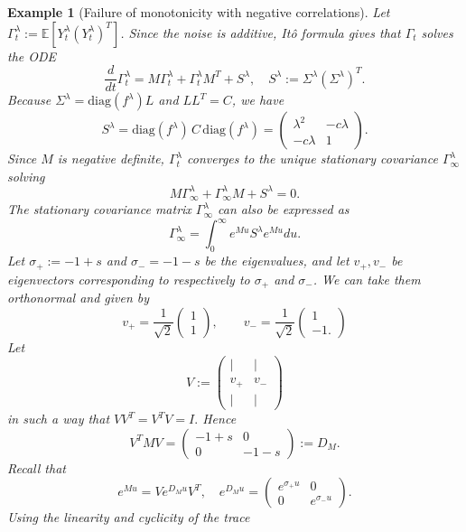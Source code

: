 \documentclass[10pt]{amsart}
\newtheorem{example}[theorem]{Example}
\numberwithin{equation}{section}
\begin{document}
\begin{example}[Failure of monotonicity with negative correlations]
Let $\Gamma_t ^\lambda:=\mathbb{E}[Y_t^\lambda (Y_t^\lambda)^T]$. Since the noise is additive, It\^{o} formula gives that $\Gamma_t $ solves the ODE
$$
\frac{d}{dt} \Gamma_t ^\lambda = M \Gamma_t ^\lambda + \Gamma_t ^\lambda M^T + S^\lambda,
\quad 
S^\lambda:=\Sigma^\lambda(\Sigma^\lambda)^T.
$$
Because $\Sigma^\lambda= \mathrm{diag}(f^\lambda)L$ and $LL^T=C$, we have
$$
S^\lambda
=  \mathrm{diag}(f^\lambda)\,C\, \mathrm{diag}(f^\lambda)
=
\begin{pmatrix}\lambda^2&-c\lambda\\ -c\lambda&1\end{pmatrix}.
$$
Since $M$ is negative definite, $\Gamma_t ^\lambda$ converges to the unique stationary covariance
$\Gamma_\infty^\lambda$ solving
\begin{equation*}
M \Gamma _\infty^\lambda + \Gamma_\infty^\lambda M + S^\lambda = 0.
\end{equation*}
The stationary covariance matrix $\Gamma_\infty^\lambda$ can also be expressed as
$$
\Gamma_\infty ^\lambda = \int_0^\infty e^{M u} S^\lambda  e^{Mu} du.
$$
Let $\sigma_+ := -1+s$ and $\sigma_- = -1 -s$ be the eigenvalues, and let $v_+,v_-$ be eigenvectors corresponding to respectively to $\sigma_+$ and $\sigma_-$. We can take them orthonormal and given by
$$
v_+ = \frac{1}{\sqrt{2}}\begin{pmatrix}
    1 \\ 1
\end{pmatrix}, \qquad v_{-} =\frac{1}{\sqrt{2}} \begin{pmatrix}
    1 \\ -1.
\end{pmatrix}
$$
Let
$$
V:= \begin{pmatrix}
\vert & \vert \\
    v_+ & v_- \\
    \vert & \vert 
\end{pmatrix}
$$
in such a way that $V V^T = V^T V = I.$ Hence
$$
V^T M V = \begin{pmatrix}
    -1+ s & 0 \\
    0 & -1-s
\end{pmatrix}:= D_M.
$$
Recall that
$$
e^{Mu} = V e^{D_M u} V^T, \quad e^{D_M u } = \begin{pmatrix}
    e^{\sigma_+ u} & 0 \\
    0 & e^{\sigma_- u}
\end{pmatrix}.
$$
Using the linearity and cyclicity of the trace
\begin{equation*}
    \begin{split}

\end{split}
\end{equation*}
\end{example}
\end{document}
